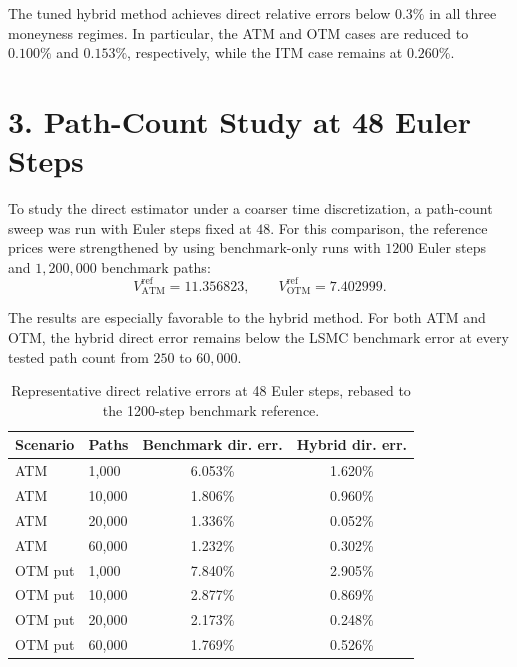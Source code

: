 \documentclass[11pt,a4paper]{article}
\begin{document}
The tuned hybrid method achieves direct relative errors below \(0.3\%\) in all three moneyness regimes. In particular, the ATM and OTM cases are reduced to \(0.100\%\) and \(0.153\%\), respectively, while the ITM case remains at \(0.260\%\).

\section*{3. Path-Count Study at 48 Euler Steps}

To study the direct estimator under a coarser time discretization, a path-count sweep was run with Euler steps fixed at \(48\). For this comparison, the reference prices were strengthened by using benchmark-only runs with \(1200\) Euler steps and \(1{,}200{,}000\) benchmark paths:
\[
V^{\mathrm{ref}}_{\mathrm{ATM}} = 11.356823,\qquad V^{\mathrm{ref}}_{\mathrm{OTM}} = 7.402999.
\]

The results are especially favorable to the hybrid method. For both ATM and OTM, the hybrid direct error remains below the LSMC benchmark error at every tested path count from \(250\) to \(60{,}000\).

\begin{table}[h!]
\centering
\caption{Representative direct relative errors at 48 Euler steps, rebased to the 1200-step benchmark reference.}
\begin{tabular}{llcc}
\toprule
Scenario & Paths & Benchmark dir. err. & Hybrid dir. err. \\
\midrule
ATM & 1,000 & 6.053\% & 1.620\% \\
ATM & 10,000 & 1.806\% & 0.960\% \\
ATM & 20,000 & 1.336\% & 0.052\% \\
ATM & 60,000 & 1.232\% & 0.302\% \\
\midrule
OTM put & 1,000 & 7.840\% & 2.905\% \\
OTM put & 10,000 & 2.877\% & 0.869\% \\
OTM put & 20,000 & 2.173\% & 0.248\% \\
OTM put & 60,000 & 1.769\% & 0.526\% \\
\bottomrule
\end{tabular}
\end{table}
\end{document}
